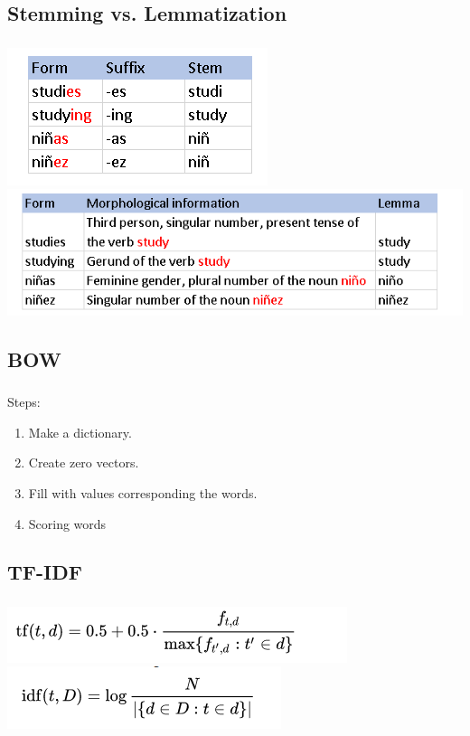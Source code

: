\documentclass[t, 11pt]{beamer}
\begin{document}
\subsection{Stemming vs. Lemmatization}
	\begin{frame}\label{}
	\frametitle{\insertsection}
	\frametitle{\insertsubsection}
	
	
	\includegraphics[width=0.4\linewidth]{stem2.png}
	\includegraphics[width=0.7\linewidth]{lem.png}
\end{frame}




		\subsection{BOW}
	\begin{frame}\label{l3}
		\frametitle{\insertsection}
		\frametitle{\insertsubsection}
		Steps: 
		\begin{enumerate}
			\item Make a dictionary.
			\item Create zero vectors.  
			\item Fill with values corresponding the words.
			\item Scoring words
		\end{enumerate}
	\end{frame}

		\subsection{TF-IDF}
		\begin{frame} \label{l4}
			\frametitle{\insertsection}
			\frametitle{\insertsubsection}
	\includegraphics[width=0.5\linewidth]{tf.png}
	\includegraphics[width=0.5\linewidth]{idf.png}
\end{frame}
\end{document}
